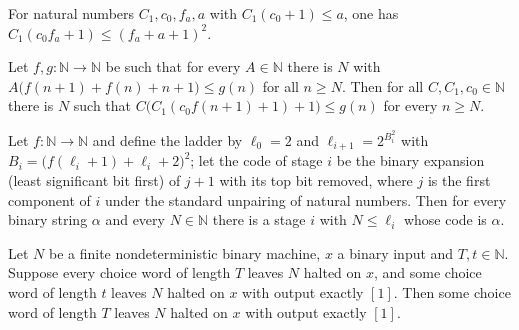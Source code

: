 \begin{lemma}
\label{Complexity.nh_bottom}
\leanok
{}
For natural numbers $C_1,c_0,f_a,a$ with $C_1(c_0+1)\le a$, one has
$C_1(c_0 f_a+1)\le (f_a+a+1)^2$.
\end{lemma}

\begin{lemma}
\label{Complexity.nh_middle}
\leanok
{}
Let $f,g:\mathbb{N}\to\mathbb{N}$ be such that for every $A\in\mathbb{N}$ there is $N$ with
$A\bigl(f(n+1)+f(n)+n+1\bigr)\le g(n)$ for all $n\ge N$. Then for all $C,C_1,c_0\in\mathbb{N}$
there is $N$ such that $C\bigl(C_1(c_0 f(n+1)+1)+1\bigr)\le g(n)$ for every $n\ge N$.
\end{lemma}

\begin{lemma}
\label{Complexity.nh_stage}
\leanok
{}
Let $f:\mathbb{N}\to\mathbb{N}$ and define the ladder by $\ell_0=2$ and
$\ell_{i+1}=2^{B_i^2}$ with $B_i=\bigl(f(\ell_i+1)+\ell_i+2\bigr)^2$; let the code of stage $i$ be
the binary expansion (least significant bit first) of $j+1$ with its top bit removed, where $j$
is the first component of $i$ under the standard unpairing of natural numbers. Then for every
binary string $\alpha$ and every $N\in\mathbb{N}$ there is a stage $i$ with $N\le\ell_i$ whose
code is $\alpha$.
\end{lemma}

\begin{lemma}
\label{Complexity.nh_accepts_of_halts}
\leanok
{}
Let $N$ be a finite nondeterministic binary machine, $x$ a binary input and $T,t\in\mathbb{N}$.
Suppose every choice word of length $T$ leaves $N$ halted on $x$, and some choice word of length
$t$ leaves $N$ halted on $x$ with output exactly $[1]$. Then some choice word of length $T$
leaves $N$ halted on $x$ with output exactly $[1]$.
\end{lemma}

